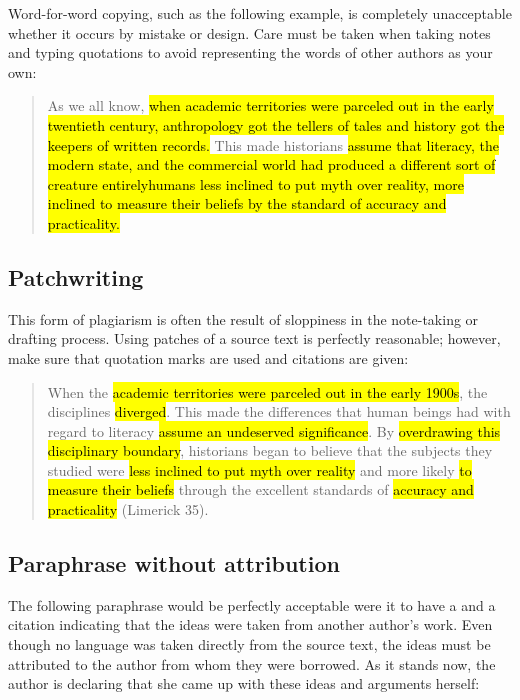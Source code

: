 Word-for-word copying, such as the following example, is completely unacceptable whether it occurs by mistake or design. Care must be taken when taking notes and typing quotations to avoid representing the words of other authors as your own:

\begin{quote}
As we all know, \hl{when academic territories were parceled out in the early twentieth century, anthropology got the tellers of tales and history got the keepers of written records.} This made historians \hl{assume that literacy, the modern state, and the commercial world had produced a different sort of creature entirely\textemdash humans less inclined to put myth over reality, more inclined to measure their beliefs by the standard of accuracy and practicality.} 

\end{quote} 

\hypertarget{patchwriting}{}

\subsection{Patchwriting}

This form of plagiarism is often the result of sloppiness in the note-taking or drafting process. Using patches of a source text is perfectly reasonable; however, make sure that quotation marks are used and citations are given:

\begin{quote}

When the \hl{academic territories were parceled out in the early 1900s}, the disciplines \hl{diverged}. This made the differences that human beings had with regard to literacy \hl{assume an undeserved significance}. By \hl{overdrawing this disciplinary boundary}, historians began to believe that the subjects they studied were \hl{less inclined to put myth over reality} and more likely \hl{to measure their beliefs} through the excellent standards of \hl{accuracy and practicality} (Limerick 35). 
\end{quote}



\subsection{Paraphrase without attribution}

The following paraphrase would be perfectly acceptable were it to have a \hyperlink{signalphrase}{\color{Ahrenge}{signal phrase}} and a citation indicating that the ideas were taken from another author's work. Even though no language was taken directly from the source text, the ideas must be attributed to the author from whom they were borrowed. As it stands now, the author is declaring that she came up with these ideas and arguments herself:

